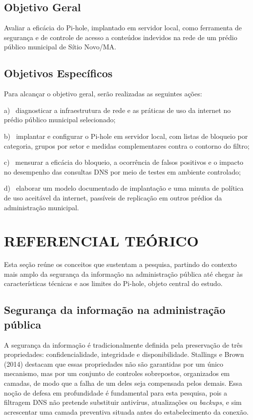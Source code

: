 \documentclass[12pt,a4paper]{article}
\begin{document}
\subsection{Objetivo Geral}
Avaliar a eficácia do Pi-hole, implantado em servidor local, como ferramenta de segurança e de controle de acesso a conteúdos indevidos na rede de um prédio público municipal de Sítio Novo/MA.

\subsection{Objetivos Específicos}
Para alcançar o objetivo geral, serão realizadas as seguintes ações:

{\leftskip=1.25cm\noindent\hangindent=0.6cm a)~ diagnosticar a infraestrutura de rede e as práticas de uso da internet no prédio público municipal selecionado;\par}
{\leftskip=1.25cm\noindent\hangindent=0.6cm b)~ implantar e configurar o Pi-hole em servidor local, com listas de bloqueio por categoria, grupos por setor e medidas complementares contra o contorno do filtro;\par}
{\leftskip=1.25cm\noindent\hangindent=0.6cm c)~ mensurar a eficácia do bloqueio, a ocorrência de falsos positivos e o impacto no desempenho das consultas DNS por meio de testes em ambiente controlado;\par}
{\leftskip=1.25cm\noindent\hangindent=0.6cm d)~ elaborar um modelo documentado de implantação e uma minuta de política de uso aceitável da internet, passíveis de replicação em outros prédios da administração municipal.\par}
\clearpage
\section{REFERENCIAL TEÓRICO}
Esta seção reúne os conceitos que sustentam a pesquisa, partindo do contexto mais amplo da segurança da informação na administração pública até chegar às características técnicas e aos limites do Pi-hole, objeto central do estudo.

\subsection{Segurança da informação na administração pública}
A segurança da informação é tradicionalmente definida pela preservação de três propriedades: confidencialidade, integridade e disponibilidade. Stallings e Brown (2014) destacam que essas propriedades não são garantidas por um único mecanismo, mas por um conjunto de controles sobrepostos, organizados em camadas, de modo que a falha de um deles seja compensada pelos demais. Essa noção de defesa em profundidade é fundamental para esta pesquisa, pois a filtragem DNS não pretende substituir antivírus, atualizações ou \textit{backups}, e sim acrescentar uma camada preventiva situada antes do estabelecimento da conexão.
\end{document}

